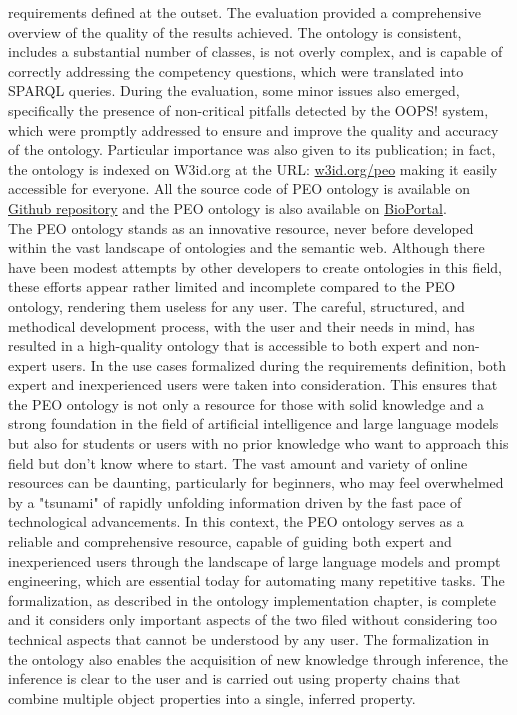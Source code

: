 requirements defined at the outset. The evaluation provided a comprehensive overview of the quality of the results achieved. The ontology is consistent, includes a substantial number of classes, is not overly complex, and is capable of correctly addressing the competency questions, which were translated into SPARQL queries. During the evaluation, some minor issues also emerged, specifically the presence of non-critical pitfalls detected by the OOPS! system, which were promptly addressed to ensure and improve the quality and accuracy of the ontology. Particular importance was also given to its publication; in fact, the ontology is indexed on W3id.org at the URL: \href{https://w3id.org/peo}{w3id.org/peo} making it easily accessible for everyone. All the source code of PEO ontology is available on \href{https://github.com/simonegramegna/peo}{Github repository} and the PEO ontology is also available on \href{https://bioportal.bioontology.org/ontologies/PEO_ONTOLOGY}{BioPortal}.\\
The PEO ontology stands as an innovative resource, never before developed within the vast landscape of ontologies and the semantic web. Although there have been modest attempts by other developers to create ontologies in this field, these efforts appear rather limited and incomplete compared to the PEO ontology, rendering them useless for any user. The careful, structured, and methodical development process, with the user and their needs in mind, has resulted in a high-quality ontology that is accessible to both expert and non-expert users. In the use cases formalized during the requirements definition, both expert and inexperienced users were taken into consideration. This ensures that the PEO ontology is not only a resource for those with solid knowledge and a strong foundation in the field of artificial intelligence and large language models but also for students or users with no prior knowledge who want to approach this field but don’t know where to start. The vast amount and variety of online resources can be daunting, particularly for beginners, who may feel overwhelmed by a "tsunami" of rapidly unfolding information driven by the fast pace of technological advancements. In this context, the PEO ontology serves as a reliable and comprehensive resource, capable of guiding both expert and inexperienced users through the landscape of large language models and prompt engineering, which are essential today for automating many repetitive tasks. The formalization, as described in the ontology implementation chapter, is complete and it considers only important aspects of the two filed without considering too technical aspects that cannot be understood by any user. The formalization in the ontology also enables the acquisition of new knowledge through inference, the inference is clear to the user and is carried out using property chains that combine multiple object properties into a single, inferred property.

